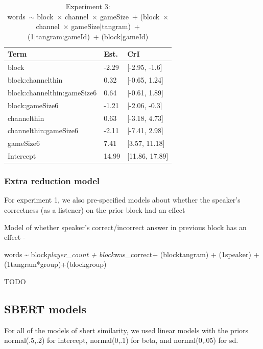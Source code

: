 \documentclass[
  english,
  a4paper,
]{article}
\begin{document}
\begin{table}[h!]

\caption{\label{tab:unnamed-chunk-11}Experiment 3:\\ words~$\sim$ block~$\times$ channel~$\times$ gameSize~+ (block~$\times$ channel~$\times$ gameSize|tangram)~+ (1|tangram:gameId)~+ (block|gameId)}
\centering
\begin{tabular}[t]{lll}
\toprule
Term & Est. & CrI\\
\midrule
block & -2.29 & {}[-2.95, -1.6]\\
block:channelthin & 0.32 & {}[-0.65, 1.24]\\
block:channelthin:gameSize6 & 0.64 & {}[-0.61, 1.89]\\
block:gameSize6 & -1.21 & {}[-2.06, -0.3]\\
channelthin & 0.63 & {}[-3.18, 4.73]\\
\addlinespace
channelthin:gameSize6 & -2.11 & {}[-7.41, 2.98]\\
gameSize6 & 7.41 & {}[3.57, 11.18]\\
Intercept & 14.99 & {}[11.86, 17.89]\\
\bottomrule
\end{tabular}
\end{table}

\hypertarget{extra-reduction-model}{%
\subsubsection{Extra reduction model}\label{extra-reduction-model}}

For experiment 1, we also pre-specified models about whether the speaker's correctness (as a listener) on the prior block had an effect

Model of whether speaker's correct/incorrect answer in previous block has an effect -

words \textasciitilde{} block\emph{player\_count + block}was\_correct+ (block\textbar tangram) + (1\textbar speaker)
+ (1\textbar tangram*group)+(block\textbar group)

TODO
\pagebreak

\hypertarget{sbert-models}{%
\subsection{SBERT models}\label{sbert-models}}

For all of the models of sbert similarity, we used linear models with the priors normal(.5,.2) for intercept, normal(0,.1) for beta, and normal(0,.05) for sd.
\end{document}
